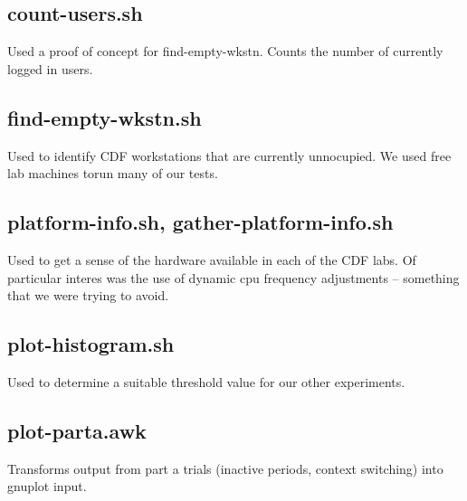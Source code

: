 \documentclass{article}
\begin{document}
\subsection{count-users.sh}
Used a proof of concept for find-empty-wkstn. Counts the number of currently
logged in users.
\subsection{find-empty-wkstn.sh}
Used to identify CDF workstations that are currently unnocupied. We used free lab machines torun many of our tests.
\subsection{platform-info.sh, gather-platform-info.sh}
Used to get a sense of the hardware available in each of the CDF labs. Of particular interes was the use of dynamic cpu frequency adjustments -- something that we were trying to avoid.
\subsection{plot-histogram.sh}
Used to determine a suitable threshold value for our other experiments.
\subsection{plot-parta.awk}
Transforms output from part a trials (inactive periods, context switching) into gnuplot input.


\end{document}
